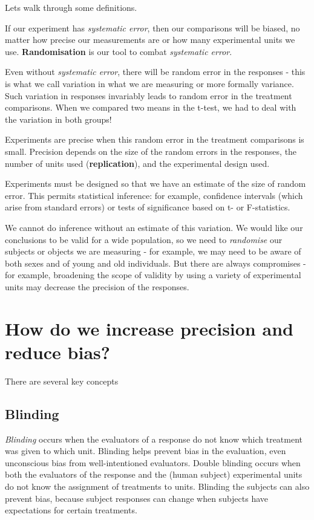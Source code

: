 \documentclass[
]{book}
\begin{document}
Lets walk through some definitions.

If our experiment has \emph{systematic error}, then our comparisons will be biased, no matter how precise our measurements are or how many experimental units we use. \textbf{Randomisation} is our tool to combat \emph{systematic error}.

Even without \emph{systematic error}, there will be random error in the responses - this is what we call variation in what we are measuring or more formally variance. Such variation in responses invariably leads to random error in the treatment comparisons. When we compared two means in the t-test, we had to deal with the variation in both groups!

Experiments are precise when this random error in the treatment comparisons is small. Precision depends on the size of the random errors in the responses, the number of units used (\textbf{replication}), and the experimental design used.

Experiments must be designed so that we have an estimate of the size of random error. This permits statistical inference: for example, confidence intervals (which arise from standard errors) or tests of significance based on t- or F-statistics.

We cannot do inference without an estimate of this variation. We would like our conclusions to be valid for a wide population, so we need to \emph{randomise} our subjects or objects we are measuring - for example, we may need to be aware of both sexes and of young and old individuals. But there are always compromises - for example, broadening the scope of validity by using a variety of experimental units may decrease the precision of the responses.

\hypertarget{how-do-we-increase-precision-and-reduce-bias}{%
\section{How do we increase precision and reduce bias?}\label{how-do-we-increase-precision-and-reduce-bias}}

There are several key concepts

\hypertarget{blinding}{%
\subsection{Blinding}\label{blinding}}

\emph{Blinding} occurs when the evaluators of a response do not know which treatment was given to which unit. Blinding helps prevent bias in the evaluation, even unconscious bias from well-intentioned evaluators. Double blinding occurs when both the evaluators of the response and the (human subject) experimental units do not know the assignment of treatments to units. Blinding the subjects can also prevent bias, because subject responses can change when subjects have expectations for certain treatments.
\end{document}
